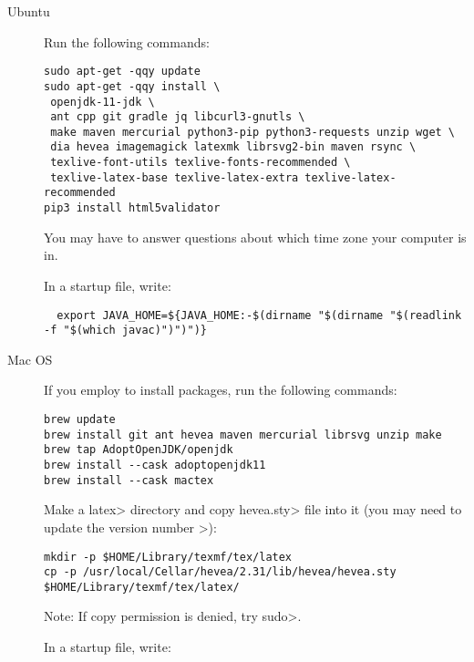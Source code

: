 \begin{description}
\item[Ubuntu]
  Run the following commands:

\begin{Verbatim}
sudo apt-get -qqy update
sudo apt-get -qqy install \
 openjdk-11-jdk \
 ant cpp git gradle jq libcurl3-gnutls \
 make maven mercurial python3-pip python3-requests unzip wget \
 dia hevea imagemagick latexmk librsvg2-bin maven rsync \
 texlive-font-utils texlive-fonts-recommended \
 texlive-latex-base texlive-latex-extra texlive-latex-recommended
pip3 install html5validator
\end{Verbatim}

  You may have to answer questions about which time zone your computer is in.

In a startup file, write:
\begin{smaller}
\begin{Verbatim}
  export JAVA_HOME=${JAVA_HOME:-$(dirname "$(dirname "$(readlink -f "$(which javac)")")")}
\end{Verbatim}
\end{smaller}

\item[Mac OS]
  If you employ  to install packages, run
  the following commands:

\begin{Verbatim}
brew update
brew install git ant hevea maven mercurial librsvg unzip make
brew tap AdoptOpenJDK/openjdk
brew install --cask adoptopenjdk11
brew install --cask mactex
\end{Verbatim}

Make a \<latex> directory and copy \<hevea.sty> file into it (you may need to update the version number >):

\begin{Verbatim}
mkdir -p $HOME/Library/texmf/tex/latex
cp -p /usr/local/Cellar/hevea/2.31/lib/hevea/hevea.sty $HOME/Library/texmf/tex/latex/
\end{Verbatim}

Note: If copy permission is denied, try \<sudo>.

In a startup file, write:


\end{description}
